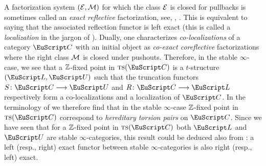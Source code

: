 \begin{remark}\label{oss.hereditary}
A factorization system $(\mathcal{E},\mathcal{M})$ for which the class $\mathcal{E}$ is closed for pullbacks is sometimes called an \emph{exact reflective} factorization, see, \eg, \cite{CHK}. This is equivalent to saying that the associated reflection functor is left exact (this is called a \emph{localization} in the jargon of \cite{CHK}). Dually,  one characterizes \emph{co-localizations} of a category $\C$ with an initial object as \emph{co-exact coreflective} factorizations where the right class $\mathcal{M}$ is closed under pushouts.  Therefore, in the stable $\infty$-case, we see that a $\mathbb{Z} $-fixed point in $\ts(\C)$ is a $t$-structure $(\cate{L},\cate{U})$ such that the truncation functors $S\colon \C\to \cate{U}$ and $R\colon \C\to \cate{L}$ respectively form a co-localizations and a localization of $\C$. In the terminology of \cite{Beligiannisreiten} we therefore find that in the stable $\infty$-case $\mathbb{Z} $-fixed point in $\ts(\C)$ correspond to \emph{hereditary torsion pairs} on $\C$. Since we have seen that for a $\mathbb{Z} $-fixed point in $\ts(\C)$ both $\cate{L}$ and $\cate{U}$ are stable $\infty$-categories, this result could be deduced also from \cite[Prop. \textbf{1.1.4.1}]{LurieHA}: a left (resp., right) exact functor between stable $\infty$-categories is also right (resp., left) exact.
 \end{remark}
 
